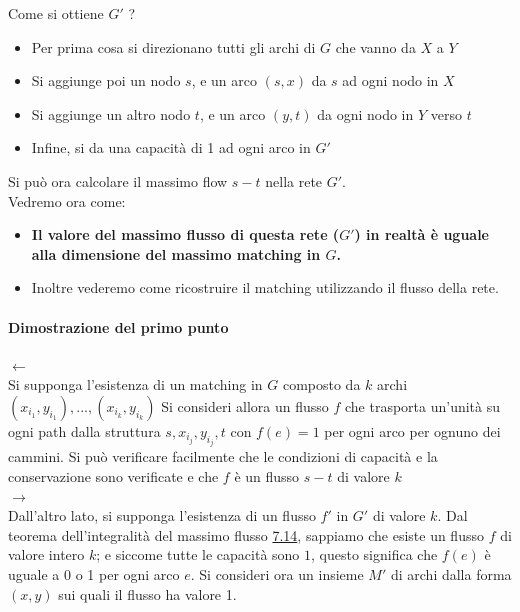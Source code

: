 Come si ottiene $G'$ ?
\begin{itemize}
	\item Per prima cosa si direzionano tutti gli archi di $G$ che vanno da $X$ a $Y$
	\item Si aggiunge poi un nodo $s$, e un arco $(s, x)$ da $s$ ad ogni nodo in $X$
	\item Si aggiunge un altro nodo $t$, e un arco $(y, t)$ da ogni nodo in $Y$ verso $t$
	\item Infine, si da una capacità di 1 ad ogni arco in $G'$
\end{itemize}

Si può ora calcolare il massimo flow $s-t$ nella rete $G'$.\\

Vedremo ora come:
\begin{itemize}
	\item \textbf{Il valore del massimo flusso di questa rete ($G'$) in
		      realtà è uguale alla dimensione del massimo matching in $G$.}
	\item Inoltre vederemo come ricostruire il matching utilizzando il flusso della rete.
\end{itemize}

\paragraph{Dimostrazione del primo punto}

$\leftarrow$\\
Si supponga l'esistenza di un matching in $G$ composto da $k$
archi $(x_{i_1}, y_{i_1}), ..., (x_{i_k}, y_{i_k})$ Si consideri
allora un flusso $f$ che trasporta un'unità su ogni path dalla
struttura $s, x_{i_j}, y_{i_j}, t$ con $f(e) = 1$ per ogni arco per
ognuno dei cammini. Si può verificare facilmente che le condizioni di
capacità e la conservazione sono verificate e che $f$ è un flusso
$s-t$ di valore $k$\\

$\rightarrow$\\
Dall'altro lato, si supponga l'esistenza di un flusso $f'$ in
$G'$ di valore $k$. Dal teorema dell'integralità del massimo flusso
\protect\hyperlink{def-714}{7.14}, sappiamo che esiste un flusso $f$
di valore intero $k$; e siccome tutte le capacità sono $1$, questo
significa che $f(e)$ è uguale a 0 o 1 per ogni arco $e$. Si
consideri ora un insieme $M'$ di archi dalla forma $(x, y)$ sui
quali il flusso ha valore 1.\\

